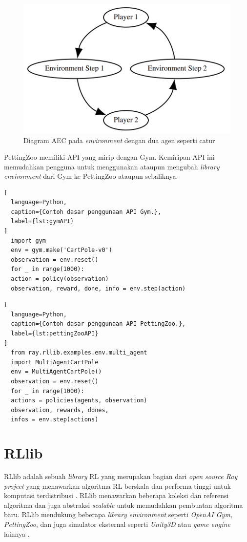 \begin{figure}[H]
  \centering
    \includegraphics[scale=0.5]{gambar/actor_environment_cycle.png}
    \caption{Diagram AEC pada \emph{environment} dengan dua agen seperti catur}
    \label{fig:actorEnvironmentCycle}
\end{figure}

PettingZoo memiliki API yang mirip dengan Gym. Kemiripan API ini memudahkan pengguna untuk menggunakan ataupun mengubah \emph{library environment} dari Gym ke PettingZoo ataupun sebaliknya.

\begin{lstlisting}[
  language=Python,
  caption={Contoh dasar penggunaan API Gym.},
  label={lst:gymAPI}
]
  import gym
  env = gym.make('CartPole-v0')
  observation = env.reset()
  for _ in range(1000):
  action = policy(observation)
  observation, reward, done, info = env.step(action)
\end{lstlisting}

\begin{lstlisting}[
  language=Python,
  caption={Contoh dasar penggunaan API PettingZoo.},
  label={lst:pettingZooAPI}
]
  from ray.rllib.examples.env.multi_agent
  import MultiAgentCartPole
  env = MultiAgentCartPole()
  observation = env.reset()
  for _ in range(1000):
  actions = policies(agents, observation)
  observation, rewards, dones,
  infos = env.step(actions)
\end{lstlisting}

\section{RLlib}
RLlib adalah sebuah \emph{library} RL yang merupakan bagian dari \emph{open source Ray project} yang menawarkan
algoritma RL berskala dan performa tinggi untuk komputasi terdistribusi \citep{rllib}.
RLlib menawarkan beberapa koleksi dan referensi algoritma dan juga abstraksi \emph{scalable} untuk memudahkan
pembuatan algoritma baru. RLlib mendukung beberapa \emph{library} \emph{environment} seperti \emph{OpenAI Gym},
\emph{PettingZoo}, dan juga simulator eksternal seperti \emph{Unity3D} atau \emph{game engine} lainnya \citep{rllibDocumentation}.

